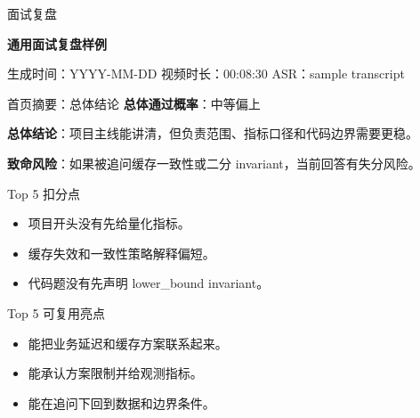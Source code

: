\documentclass[a4paper,11pt]{article}
\begin{document}
\begin{titlepage}
\thispagestyle{empty}
\centering
{\Large 面试复盘\par}
\vspace{0.6cm}
{\Huge\bfseries 通用面试复盘样例\par}
\vspace{0.35cm}
{\large \par}
\vspace{0.5cm}
{\small 生成时间：YYYY-MM-DD \quad 视频时长：00:08:30 \quad ASR：sample transcript\par}
\vspace{0.7cm}

\begin{verdictbox}{首页摘要：总体结论}
\textbf{总体通过概率}：中等偏上

\textbf{总体结论}：项目主线能讲清，但负责范围、指标口径和代码边界需要更稳。

\textbf{致命风险}：如果被追问缓存一致性或二分 invariant，当前回答有失分风险。
\end{verdictbox}

\vspace{0.35cm}
\begin{minipage}[t]{0.48\textwidth}
\small
\begin{riskbox}{Top 5 扣分点}
\begin{itemize}
\item 项目开头没有先给量化指标。
\item 缓存失效和一致性策略解释偏短。
\item 代码题没有先声明 lower\_bound invariant。
\end{itemize}
\end{riskbox}
\normalsize
\end{minipage}
\hfill
\begin{minipage}[t]{0.48\textwidth}
\small
\begin{betterbox}{Top 5 可复用亮点}
\begin{itemize}
\item 能把业务延迟和缓存方案联系起来。
\item 能承认方案限制并给观测指标。
\item 能在追问下回到数据和边界条件。
\end{itemize}
\end{betterbox}
\normalsize
\end{minipage}


\end{titlepage}
\end{document}
